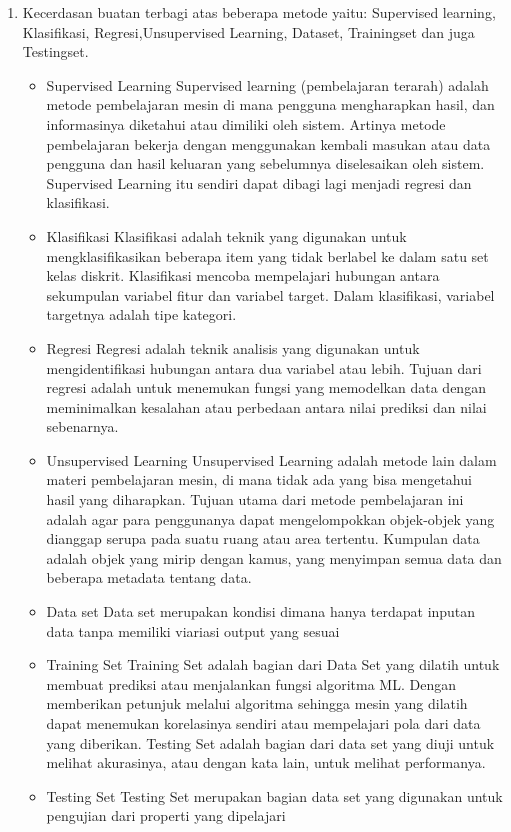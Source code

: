 \begin{enumerate}
	\item Kecerdasan buatan terbagi atas beberapa metode yaitu:
	\hfill\break
	Supervised learning,  Klasifikasi, Regresi,Unsupervised Learning, Dataset, Trainingset dan juga Testingset.
	\begin{itemize}
		\item Supervised Learning
		\hfill\break
Supervised learning (pembelajaran terarah) adalah metode pembelajaran mesin di mana pengguna mengharapkan hasil, dan informasinya diketahui atau dimiliki oleh sistem. Artinya metode pembelajaran bekerja dengan menggunakan kembali masukan atau data pengguna dan hasil keluaran yang sebelumnya diselesaikan oleh sistem. Supervised Learning itu sendiri dapat dibagi lagi menjadi regresi dan klasifikasi.
		\item Klasifikasi
		\hfill\break
Klasifikasi adalah teknik yang digunakan untuk mengklasifikasikan beberapa item yang tidak berlabel ke dalam satu set kelas diskrit. Klasifikasi mencoba mempelajari hubungan antara sekumpulan variabel fitur dan variabel target. Dalam klasifikasi, variabel targetnya adalah tipe kategori.
		\item Regresi
		\hfill\break
Regresi adalah teknik analisis yang digunakan untuk mengidentifikasi hubungan antara dua variabel atau lebih. Tujuan dari regresi adalah untuk menemukan fungsi yang memodelkan data dengan meminimalkan kesalahan atau perbedaan antara nilai prediksi dan nilai sebenarnya.
		\item Unsupervised Learning 
		\hfill\break
Unsupervised Learning adalah metode lain dalam materi pembelajaran mesin, di mana tidak ada yang bisa mengetahui hasil yang diharapkan. Tujuan utama dari metode pembelajaran ini adalah agar para penggunanya dapat mengelompokkan objek-objek yang dianggap serupa pada suatu ruang atau area tertentu.
Kumpulan data adalah objek yang mirip dengan kamus, yang menyimpan semua data dan beberapa metadata tentang data.
		\item Data set
		\hfill\break
Data set	merupakan kondisi dimana hanya terdapat inputan data tanpa memiliki viariasi output yang sesuai
		\item Training Set
		\hfill\break
Training Set adalah bagian dari Data Set yang dilatih untuk membuat prediksi atau menjalankan fungsi algoritma ML. Dengan memberikan petunjuk melalui algoritma sehingga mesin yang dilatih dapat menemukan korelasinya sendiri atau mempelajari pola dari data yang diberikan. Testing Set adalah bagian dari data set yang diuji untuk melihat akurasinya, atau dengan kata lain, untuk melihat performanya.		
		\item Testing Set
		\hfill\break
Testing Set	merupakan bagian data set yang digunakan untuk pengujian dari properti yang dipelajari
	\end{itemize}
\end{enumerate}

